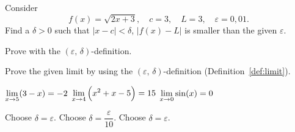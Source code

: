 \renewcommand{\ExerciseListName}{Assignement}


\ifanalysis

\subsection*{}
\begin{Exercise}[difficulty = 2] Consider
    \[ f(x)=\sqrt{2x+3}, \quad c=3, \quad L=3, \quad \varepsilon=0,01. \]
   Find a $\delta > 0$ such that $|x-c| < \delta $, $|f(x) - L|$ is smaller than the given $\varepsilon$.  

\end{Exercise}

\begin{Answer}\phantom{}
    Prove with the $(\varepsilon,\,\delta)$-definition.
\end{Answer}
    
\begin{Exercise} Prove the given limit by using the $(\varepsilon,\,\delta)$-definition (Definition~\ref{def:limit}).
    \begin{multicols}{3}
        \Question[difficulty = 1] $\displaystyle\lim_{x\rightarrow 5} (3-x) = -2 $
        \Question[difficulty = 2] $\displaystyle\lim_{x\rightarrow 4} \left(x^2+x-5\right) = 15 $
        \Question[difficulty = 1] $\displaystyle\lim_{x\rightarrow 0} \sin (x) = 0 $
        \EndCurrentQuestion
    \end{multicols}

\end{Exercise}

\begin{Answer}\phantom{}
    \begin{multicols}{3}
    
        \Question Choose $\delta = \varepsilon$.
        \Question Choose $\delta = \dfrac{\varepsilon}{10}$.
        \Question Choose $\delta = \varepsilon$.
    \EndCurrentQuestion
    \end{multicols}
\end{Answer}
    
\subsection*{}

